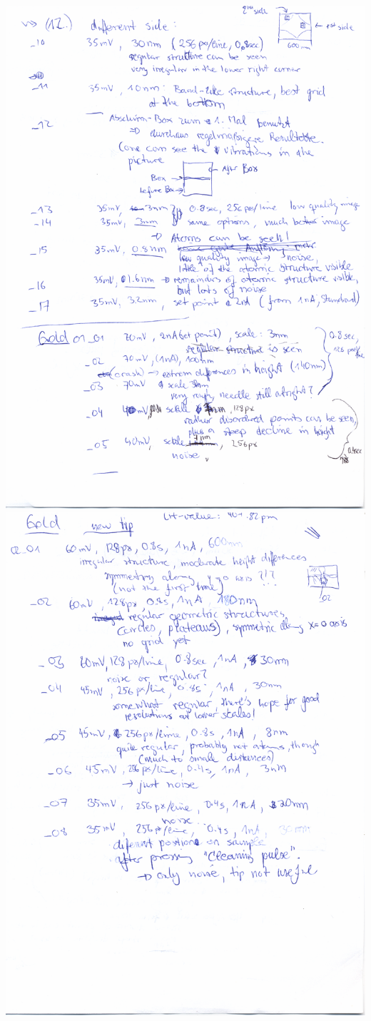     \includegraphics[width=\linewidth]{protokoll/rtm_protokoll_03}
\clearpage
    \includegraphics[width=\linewidth]{protokoll/rtm_protokoll_04}
\clearpage

